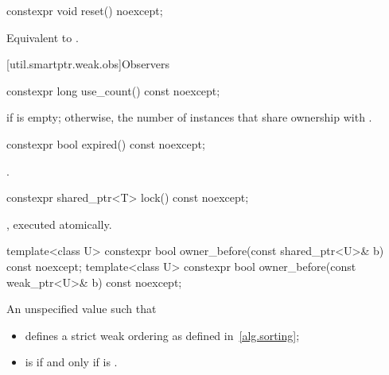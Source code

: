 %
\begin{itemdecl}
constexpr void reset() noexcept;
\end{itemdecl}

\begin{itemdescr}
\pnum
\effects
Equivalent to .
\end{itemdescr}

[util.smartptr.weak.obs]{Observers}
%
\begin{itemdecl}
constexpr long use_count() const noexcept;
\end{itemdecl}

\begin{itemdescr}
\pnum
\returns
{} if  is empty;
otherwise, the number of  instances
that share ownership with .
\end{itemdescr}

%
\begin{itemdecl}
constexpr bool expired() const noexcept;
\end{itemdecl}

\begin{itemdescr}
\pnum
\returns
{}.
\end{itemdescr}

%
\begin{itemdecl}
constexpr shared_ptr<T> lock() const noexcept;
\end{itemdecl}

\begin{itemdescr}
\pnum
\returns
{}, executed atomically.
\end{itemdescr}

%
\begin{itemdecl}
template<class U> constexpr bool owner_before(const shared_ptr<U>& b) const noexcept;
template<class U> constexpr bool owner_before(const weak_ptr<U>& b) const noexcept;
\end{itemdecl}

\begin{itemdescr}
\pnum
\returns
An unspecified value such that
\begin{itemize}
\item {} defines a strict weak ordering as defined in~\ref{alg.sorting};

\item {} is 
if and only if  is .
\end{itemize}
\end{itemdescr}

